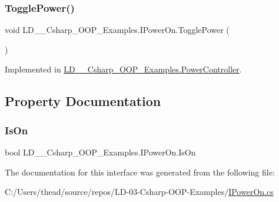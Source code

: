 \subsubsection{\texorpdfstring{Toggle\+Power()}{TogglePower()}}
{\footnotesize\ttfamily void L\+D\+\_\+\_\+\+Csharp\+\_\+\+O\+O\+P\+\_\+\+Examples.\+I\+Power\+On.\+Toggle\+Power (\begin{DoxyParamCaption}{ }\end{DoxyParamCaption})}



Implemented in \mbox{\hyperlink{class_l_d__03___csharp___o_o_p___examples_1_1_power_controller_accb660a5257db2d4d1df4e35d4147027}{L\+D\+\_\+\_\+\+Csharp\+\_\+\+O\+O\+P\+\_\+\+Examples.\+Power\+Controller}}.



\subsection{Property Documentation}
\mbox{\label{interface_l_d__03___csharp___o_o_p___examples_1_1_i_power_on_ac1162237fd45586cb8f98e42a4778402}} 
\subsubsection{\texorpdfstring{Is\+On}{IsOn}}
{\footnotesize\ttfamily bool L\+D\+\_\+\_\+\+Csharp\+\_\+\+O\+O\+P\+\_\+\+Examples.\+I\+Power\+On.\+Is\+On\hspace{0.3cm}{\ttfamily [get]}}



The documentation for this interface was generated from the following file\+:\begin{DoxyCompactItemize}
\item 
C\+:/\+Users/thead/source/repos/\+L\+D-\/03-\/\+Csharp-\/\+O\+O\+P-\/\+Examples/\mbox{\hyperlink{_i_power_on_8cs}{I\+Power\+On.\+cs}}\end{DoxyCompactItemize}
